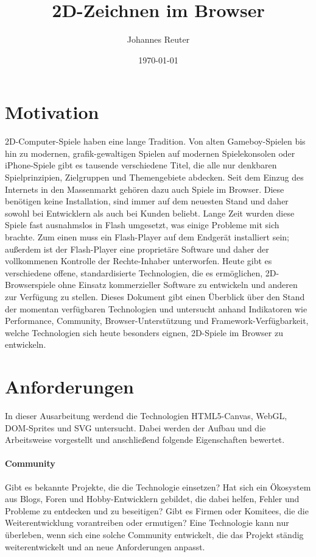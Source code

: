 \documentclass[a4paper,12pt]{article}
\title{2D-Zeichnen im Browser}
\author{Johannes Reuter}
\date{\today}
\begin{document}
\maketitle
\tableofcontents
\section{Motivation}
2D-Computer-Spiele haben eine lange Tradition. Von alten Gameboy-Spielen bis hin zu modernen, grafik-gewaltigen Spielen auf modernen Spielekonsolen oder iPhone-Spiele gibt es tausende verschiedene Titel, die alle nur denkbaren Spielprinzipien, Zielgruppen und Themengebiete abdecken. Seit dem Einzug des Internets in den Massenmarkt gehören dazu auch Spiele im Browser.
Diese benötigen keine Installation, sind immer auf dem neuesten Stand und daher sowohl bei Entwicklern als auch bei Kunden beliebt. Lange Zeit wurden diese Spiele fast ausnahmslos in Flash umgesetzt, was einige Probleme mit sich brachte. Zum einen muss ein Flash-Player auf dem Endgerät installiert sein; außerdem ist der Flash-Player eine proprietäre Software und daher der vollkommenen Kontrolle der Rechte-Inhaber unterworfen. Heute gibt es verschiedene offene, standardisierte Technologien, die es ermöglichen, 2D-Browserspiele ohne Einsatz kommerzieller Software zu entwickeln und anderen zur Verfügung zu stellen. Dieses Dokument gibt einen Überblick über den Stand der momentan verfügbaren Technologien und untersucht anhand Indikatoren wie Performance, Community, Browser-Unterstützung und Framework-Verfügbarkeit, welche Technologien sich heute besonders eignen, 2D-Spiele im Browser zu entwickeln.
\section{Anforderungen}
In dieser Ausarbeitung werdend die Technologien HTML5-Canvas, WebGL, DOM-Sprites und SVG untersucht. Dabei werden der Aufbau und die Arbeitsweise vorgestellt und anschließend folgende Eigenschaften bewertet.
\paragraph{Community}
Gibt es bekannte Projekte, die die Technologie einsetzen? Hat sich ein Ökosystem aus Blogs, Foren und Hobby-Entwicklern gebildet, die dabei helfen, Fehler und Probleme zu entdecken und zu beseitigen? Gibt es Firmen oder Komitees, die die Weiterentwicklung vorantreiben oder ermutigen? Eine Technologie kann nur überleben, wenn sich eine solche Community entwickelt, die das Projekt ständig weiterentwickelt und an neue Anforderungen anpasst.
\end{document}
